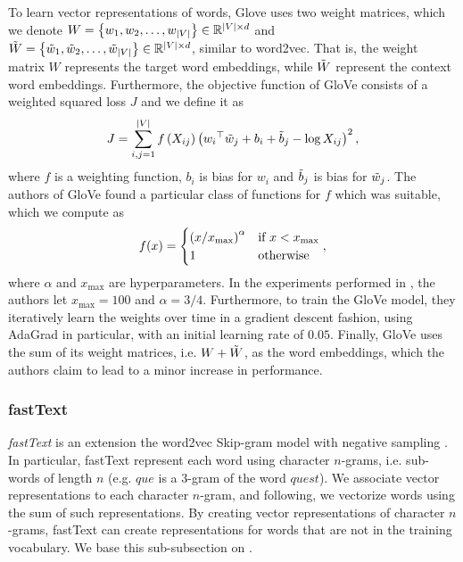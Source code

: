 To learn vector representations of words, Glove uses two weight matrices, which we denote $W=\left\{w_1, w_2, \ldots, w_{|V|}\right\} \in \mathbb{R}^{|V| \times d}$ and $\Tilde{W}=\left\{\Tilde{w}_1, \Tilde{w}_2, \ldots, \Tilde{w}_{|V|}\right\} \in \mathbb{R}^{|V| \times d}$, similar to word2vec. That is, the weight matrix $W$ represents the target word embeddings, while $\Tilde{W}$ represent the context word embeddings. Furthermore, the objective function of GloVe consists of a weighted squared loss $J$ and we define it as
\begin{align}
    J = \sum\limits_{i, j = 1}^{|V|} f \left(X_{ij}\right) \left({w_i}^\top \Tilde{w}_j + b_i + \Tilde{b}_j - \log X_{ij}\right)^2,
    \label{eqn:glove-loss}
\end{align}
where $f$ is a weighting function, $b_i$ is bias for $w_i$ and $\Tilde{b}_j$ is bias for $\Tilde{w}_j$. The authors of GloVe found a particular class of functions for $f$ which was suitable, which we compute as
\begin{align}
    f(x) = \begin{cases}
        \left(x / x_{\text{max}}\right)^\alpha & \mbox{if } x < x_{\text{max}} \\
        1 & \text{otherwise}
    \end{cases},
    \label{eqn:glove-loss-f-function}
\end{align}
where $\alpha$ and $x_{\text{max}}$ are hyperparameters. In the experiments performed in \cite{pennington2014glove}, the authors let $x_{\text{max}}=100$ and $\alpha=3/4$. Furthermore, to train the GloVe model, they iteratively learn the weights over time in a gradient descent fashion, using AdaGrad \cite{Duchi2011} in particular, with an initial learning rate of $0.05$. Finally, GloVe uses the sum of its weight matrices, i.e. $W + \Tilde{W}$, as the word embeddings, which the authors claim to lead to a minor increase in performance.

\subsubsection{fastText}
\label{sec:fasttext}
\textit{fastText} is an extension the word2vec Skip-gram model with negative sampling \cite{bojanowski2017enriching}. In particular, fastText represent each word using character $n$-grams, i.e. sub-words of length $n$ (e.g. $\textit{que}$ is a $3$-gram of the word $\textit{quest}$). We associate vector representations to each character $n$-gram, and following, we vectorize words using the sum of such representations. By creating vector representations of character $n$-grams, fastText can create representations for words that are not in the training vocabulary. We base this sub-subsection on \cite{bojanowski2017enriching}.


